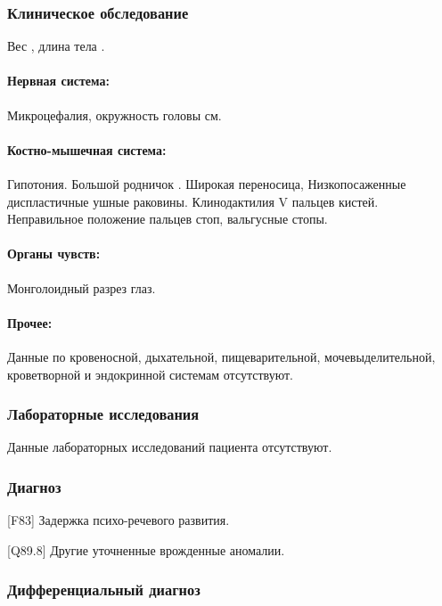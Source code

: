 \documentclass[a4paper,14pt]{extarticle}
\newcommand{\gramm}{г}
\newcommand{\cm}{см}
\newcommand{\DS}[2]{[#2] #1}
\begin{document}
\subsubsection*{Клиническое обследование}

Вес \numprint[\gramm]{3410}, длина тела \numprint[\cm]{53}.

\paragraph{Нервная система:} Микроцефалия, окружность головы \numprint[\cm]{42} см.

\paragraph{Костно-мышечная система:} Гипотония. Большой родничок \numprint[\cm]{1x1}. Широкая переносица, Низкопосаженные диспластичные ушные раковины. Клинодактилия V пальцев кистей. Неправильное положение пальцев стоп, вальгусные стопы.

\paragraph{Органы чувств:} Монголоидный разрез глаз.

\paragraph{Прочее:} Данные по кровеносной, дыхательной, пищеварительной, мочевыделительной, кроветворной и эндокринной системам отсутствуют.

\subsubsection*{Лабораторные исследования}

Данные лабораторных исследований пациента отсутствуют.

\subsubsection*{Диагноз}

\DS{Задержка психо-речевого развития}{F83}.

\DS{Другие уточненные врожденные аномалии}{Q89.8}.

\subsubsection*{Дифференциальный диагноз}
\end{document}
